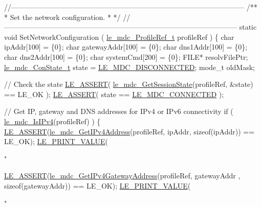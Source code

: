 \begin{DoxyCodeInclude}
\textcolor{comment}{//--------------------------------------------------------------------------------------------------}\textcolor{comment}{}
\textcolor{comment}{/**}
\textcolor{comment}{ * Set the network configuration.}
\textcolor{comment}{ *}
\textcolor{comment}{ */}
\textcolor{comment}{//--------------------------------------------------------------------------------------------------}
\textcolor{keyword}{static} \textcolor{keywordtype}{void} SetNetworkConfiguration
(
    \hyperlink{le__mdc__interface_8h_a91074d8f0d88c6645e3085dfadf87011}{le\_mdc\_ProfileRef\_t} profileRef
)
\{
    \textcolor{keywordtype}{char} ipAddr[100] = \{0\};
    \textcolor{keywordtype}{char} gatewayAddr[100] = \{0\};
    \textcolor{keywordtype}{char} dns1Addr[100] = \{0\};
    \textcolor{keywordtype}{char} dns2Addr[100] = \{0\};
    \textcolor{keywordtype}{char} systemCmd[200] = \{0\};
    FILE* resolvFilePtr;
    \hyperlink{le__mdc__interface_8h_a0727e543d0394422963c8d6297947333}{le\_mdc\_ConState\_t} state = \hyperlink{le__mdc__interface_8h_a0727e543d0394422963c8d6297947333a6d11ee963528c79d73a269eb85202ba7}{LE\_MDC\_DISCONNECTED};
    mode\_t oldMask;

    \textcolor{comment}{// Check the state}
    \hyperlink{le__log_8h_ac0dbbef91dc0fed449d0092ff0557b39}{LE\_ASSERT}( \hyperlink{le__mdc__interface_8h_add91c364e8b3e4e82a0ce64e480c016b}{le\_mdc\_GetSessionState}(profileRef, &state) == LE\_OK );
    \hyperlink{le__log_8h_ac0dbbef91dc0fed449d0092ff0557b39}{LE\_ASSERT}( state == \hyperlink{le__mdc__interface_8h_a0727e543d0394422963c8d6297947333a0a8a2113935b881b76c59b94cf7223b8}{LE\_MDC\_CONNECTED} );

    \textcolor{comment}{// Get IP, gateway and DNS addresses for IPv4 or IPv6 connectivity}
    \textcolor{keywordflow}{if} ( \hyperlink{le__mdc__interface_8h_aa3912e94864a6e5862e07f58b3772cba}{le\_mdc\_IsIPv4}(profileRef) )
    \{
        \hyperlink{le__log_8h_ac0dbbef91dc0fed449d0092ff0557b39}{LE\_ASSERT}(\hyperlink{le__mdc__interface_8h_a0b5e11efda06472fc6c525101fceafe6}{le\_mdc\_GetIPv4Address}(profileRef, ipAddr, \textcolor{keyword}{sizeof}(ipAddr)) 
      == LE\_OK);
        \hyperlink{le__print_8h_a1a6709c55d8d08c496846ba2295138b7}{LE\_PRINT\_VALUE}(\textcolor{stringliteral}{"%

        \hyperlink{le__log_8h_ac0dbbef91dc0fed449d0092ff0557b39}{LE\_ASSERT}(\hyperlink{le__mdc__interface_8h_a290cff563b19ee4891bcd5c8908c54f9}{le\_mdc\_GetIPv4GatewayAddress}(profileRef, gatewayAddr
      , \textcolor{keyword}{sizeof}(gatewayAddr))
                                                                                          == LE\_OK);
        \hyperlink{le__print_8h_a1a6709c55d8d08c496846ba2295138b7}{LE\_PRINT\_VALUE}(\textcolor{stringliteral}{"%

}}
\end{DoxyCodeInclude}
